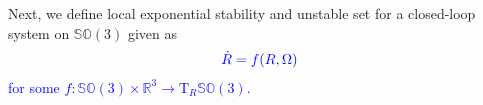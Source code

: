 \documentclass{article}
\newcommand{\SOthree}{\mathbb{SO}(3)}
\newcommand{\R}[1]{\mathbb{R}^{#1}}
\newtheorem{definition}{Definition}
\newcommand{\textblue}[1]{\textcolor{blue}{#1}}
\newcommand{\Rtilde}{\tilde{R}}
\newcommand{\normSOthree}[1]{{{\vert}#1 {\vert}_I}}
\newcommand{\expo}[1]{e^{#1}}
\newcommand{\T}[2]{\text{T}_{#1}{#2}}
\begin{document}
Next, we define local exponential stability and {unstable set} for a closed-loop system on $\SOthree$ given as
\begin{align}\label{eq:CL-rotm}
    \textblue{\dot{R} = f(R, \Omega)}
\end{align}
\textblue{for some $f:\SOthree\times \R{3}\to \T{R}{\SOthree}$.}

\end{document}
